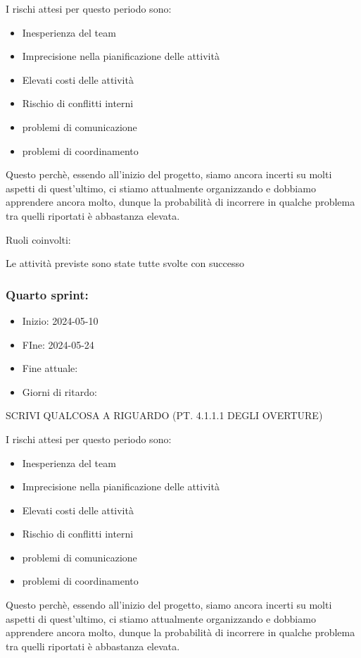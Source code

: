 I rischi attesi per questo periodo sono:
\begin{itemize}
    \item Inesperienza del team
    \item Imprecisione nella pianificazione delle attività
    \item Elevati costi delle attività
    \item Rischio di conflitti interni 
    \item problemi di comunicazione
    \item problemi di coordinamento
\end{itemize}
Questo perchè, essendo all’inizio del progetto, siamo ancora incerti su molti aspetti di quest’ultimo, ci stiamo attualmente organizzando e dobbiamo apprendere ancora molto, dunque la probabilità di incorrere in qualche problema tra quelli riportati è abbastanza elevata.

Ruoli coinvolti:

Le attività previste sono state tutte svolte con successo





\subsubsection{Quarto sprint:}
\begin{itemize}
    \item Inizio: 2024-05-10
    \item FIne: 2024-05-24
    \item Fine attuale:
    \item Giorni di ritardo:
\end{itemize}

SCRIVI QUALCOSA A RIGUARDO (PT. 4.1.1.1 DEGLI OVERTURE)

I rischi attesi per questo periodo sono:
\begin{itemize}
    \item Inesperienza del team
    \item Imprecisione nella pianificazione delle attività
    \item Elevati costi delle attività
    \item Rischio di conflitti interni 
    \item problemi di comunicazione
    \item problemi di coordinamento
\end{itemize}
Questo perchè, essendo all’inizio del progetto, siamo ancora incerti su molti aspetti di quest’ultimo, ci stiamo attualmente organizzando e dobbiamo apprendere ancora molto, dunque la probabilità di incorrere in qualche problema tra quelli riportati è abbastanza elevata.

